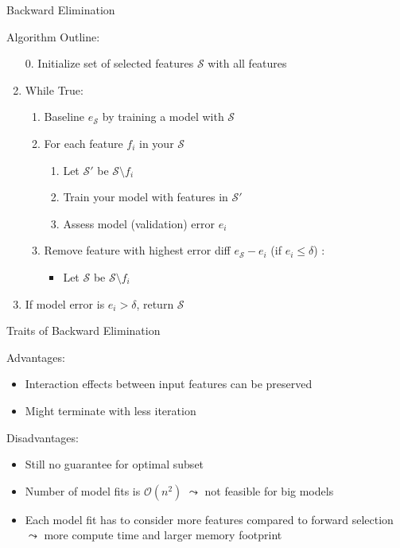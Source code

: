 \documentclass[aspectratio=169]{../latex_main/tntbeamer}  %
\begin{document}
	\begin{frame}[c]{Backward Elimination}

    Algorithm Outline:
    \begin{enumerate}
        \item[0.] Initialize set of selected features $\mathcal{S}$ with all features
        \item While True:
        \begin{enumerate}
            \item Baseline $e_\mathcal{S}$ by training a model with $\mathcal{S}$
            \item For each feature $f_i$ in your $\mathcal{S}$
            \begin{enumerate}
                \item Let $\mathcal{S}'$ be $\mathcal{S} \setminus f_i$
                \item Train your model with features in $\mathcal{S}'$
                \item Assess model (validation) error $e_i$
            \end{enumerate}
            \item Remove feature with highest error diff $e_\mathcal{S} - e_i$ (if $e_i \leq \delta$) : 
            \begin{itemize}
                \item Let $\mathcal{S}$ be  $\mathcal{S} \setminus f_i$
            \end{itemize}
        \end{enumerate}
        \item If model error is $e_i > \delta$, return $\mathcal{S}$
    \end{enumerate}

	\end{frame}
	
	\begin{frame}{Traits of Backward Elimination}
    
    Advantages:
    \begin{itemize}
        \item Interaction effects between input features can be preserved
        \item Might terminate with less iteration
    \end{itemize}

    Disadvantages:
    \begin{itemize}
        \item Still no guarantee for optimal subset
        \item Number of model fits is $\mathcal{O}(n^2)$ $\leadsto$ not feasible for big models
        \item Each model fit has to consider more features compared to forward selection $\leadsto$ more compute time and larger memory footprint
    \end{itemize}

	\end{frame}
	
\end{document}

